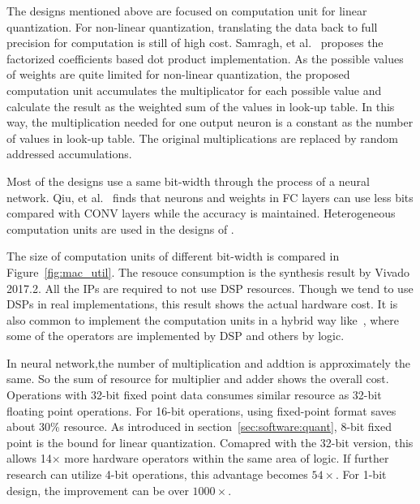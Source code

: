 The designs mentioned above are focused on computation unit for linear quantization. For non-linear quantization, translating the data back to full precision for computation is still of high cost. Samragh, et al.~\cite{samragh2017customizing} proposes the factorized coefficients based dot product implementation. As the possible values of weights are quite limited for non-linear quantization, the proposed computation unit accumulates the multiplicator for each possible value and calculate the result as the weighted sum of the values in look-up table. In this way, the multiplication needed for one output neuron is a constant as the number of values in look-up table. The original multiplications are replaced by random addressed accumulations.

Most of the designs use a same bit-width through the process of a neural network. Qiu, et al.~\cite{qiu2016going} finds that neurons and weights in FC layers can use less bits compared with CONV layers while the accuracy is maintained. Heterogeneous computation units are used in the designs of \cite{zhao2017accelerating, guo2017bit}.

The size of computation units of different bit-width is compared in Figure~\ref{fig:mac_util}. The resouce consumption is the synthesis result by Vivado 2017.2. All the IPs are required to not use DSP resources. Though we tend to use DSPs in real implementations, this result shows the actual hardware cost. It is also common to implement the computation units in a hybrid way like~\cite{qiu2016going}, where some of the operators are implemented by DSP and others by logic.

In neural network,the number of multiplication and addtion is approximately the same. So the sum of resource for multiplier and adder shows the overall cost. Operations with 32-bit fixed point data consumes similar resource as 32-bit floating point operations. For 16-bit operations, using fixed-point format saves about 30\% resource. As introduced in section~\ref{sec:software:quant}, 8-bit fixed point is the bound for linear quantization. Comapred with the 32-bit version, this allows 14$\times$ more hardware operators within the same area of logic. If further research can utilize 4-bit operations, this advantage becomes $54\times$. For 1-bit design, the improvement can be over $1000\times$.

